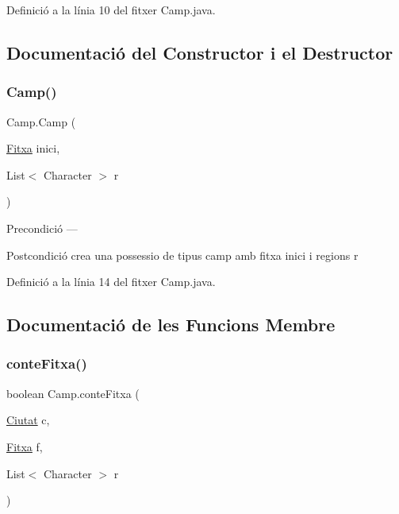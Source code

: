 Definició a la línia 10 del fitxer Camp.\+java.



\subsection{Documentació del Constructor i el Destructor}
\mbox{\label{class_camp_a9d376bd3292221a79dd845139e1f0546}} 
\subsubsection{\texorpdfstring{Camp()}{Camp()}}
{\footnotesize\ttfamily Camp.\+Camp (\begin{DoxyParamCaption}\item[{\mbox{\hyperlink{class_fitxa}{Fitxa}}}]{inici,  }\item[{List$<$ Character $>$}]{r }\end{DoxyParamCaption})}

\begin{DoxyPrecond}{Precondició}
--- 
\end{DoxyPrecond}
\begin{DoxyPostcond}{Postcondició}
crea una possessio de tipus camp amb fitxa inici i regions r 
\end{DoxyPostcond}


Definició a la línia 14 del fitxer Camp.\+java.



\subsection{Documentació de les Funcions Membre}
\mbox{\label{class_camp_a2bd097873f0c20f7e1ca04cb455ca114}} 
\subsubsection{\texorpdfstring{conte\+Fitxa()}{conteFitxa()}}
{\footnotesize\ttfamily boolean Camp.\+conte\+Fitxa (\begin{DoxyParamCaption}\item[{\mbox{\hyperlink{class_ciutat}{Ciutat}}}]{c,  }\item[{\mbox{\hyperlink{class_fitxa}{Fitxa}}}]{f,  }\item[{List$<$ Character $>$}]{r }\end{DoxyParamCaption})\hspace{0.3cm}{\ttfamily [private]}}

